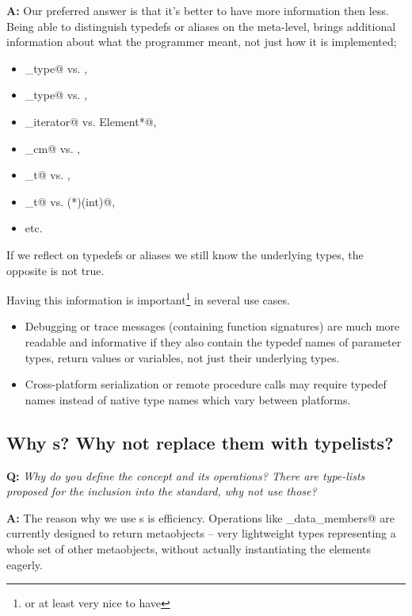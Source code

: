 \textbf{A:} Our preferred answer is that it's better to have more information
then less. Being able to distinguish typedefs or aliases on the meta-level,
brings additional information about what the programmer meant, not just how
it is implemented;
\begin{itemize}
	\item \verb@size_type@ vs. \verb@unsigned@,
	\item \verb@rank_type@ vs. \verb@short@,
	\item \verb@const_iterator@ vs. \verb@const Element*@,
	\item \verb@height_cm@ vs. \verb@float@,
	\item \verb@pid_t@ vs. \verb@int@,
	\item \verb@sighandler_t@ vs. \verb@void (*)(int)@,
	\item etc.
\end{itemize}

If we reflect on typedefs or aliases we still know the underlying types,
the opposite is not true.  

Having this information is important\footnote{or at least very nice to have}
in several use cases.

\begin{itemize}
	\item Debugging or trace messages (containing function signatures)
		are much more readable and informative if they also contain 
		the typedef names of parameter types, return values or variables,
		not just their underlying types.
	\item Cross-platform serialization or remote procedure calls may require
		typedef names instead of native type names which vary between
		platforms.
\end{itemize}


\subsection{Why s? Why not replace them with typelists?}

\textbf{Q:} {\em Why do you define the  concept and its
operations? There are type-lists proposed for the inclusion into the standard,
why not use those?}

\textbf{A:} The reason why we use s is efficiency.
Operations like \verb@get_data_members@ are currently designed to return
metaobjects --  very lightweight types representing a whole set of
other metaobjects, without actually instantiating the elements eagerly.

